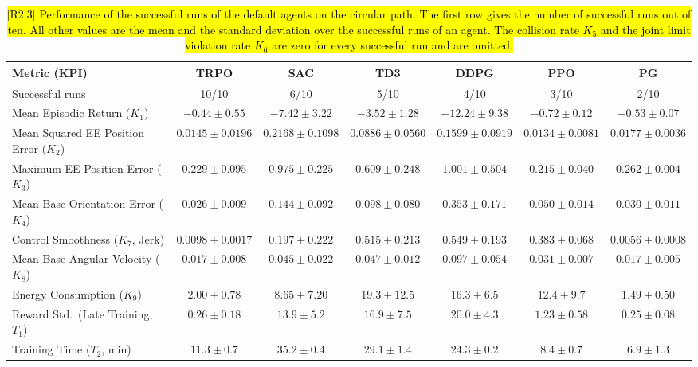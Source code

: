 \documentclass{ieeeaccess}
\newcommand{\hlone}[1]{{\sethlcolor{rone}\hl{#1}}}
\begin{document}
\begin{table}[!t]
\centering
\caption{\hlone{[R2.3] Performance of the successful runs of the default agents on the circular
path. The first row gives the number of successful runs out of ten. All other values are the mean and
the standard deviation over the successful runs of an agent. The collision rate $K_5$ and the joint
limit violation rate $K_6$ are zero for every successful run and are omitted.}}
\label{tab:kpi_comp}
\renewcommand{\arraystretch}{1.2}
\setlength{\tabcolsep}{2.4pt}
\footnotesize
\begin{tabular}{lcccccc}
\toprule
\textbf{Metric (KPI)} & \textbf{TRPO} & \textbf{SAC} & \textbf{TD3} & \textbf{DDPG} & \textbf{PPO} &
  \textbf{PG} \\
\midrule
Successful runs & 10/10 & 6/10 & 5/10 & 4/10 & 3/10 & 2/10 \\
Mean Episodic Return ($K_1$) & $-0.44 \pm 0.55$ & $-7.42 \pm 3.22$ & $-3.52 \pm 1.28$ &
  $-12.24 \pm 9.38$ & $-0.72 \pm 0.12$ & $-0.53 \pm 0.07$ \\
Mean Squared EE Position Error ($K_2$) & $0.0145 \pm 0.0196$ & $0.2168 \pm 0.1098$ &
  $0.0886 \pm 0.0560$ & $0.1599 \pm 0.0919$ & $0.0134 \pm 0.0081$ & $0.0177 \pm 0.0036$ \\
Maximum EE Position Error ($K_3$) & $0.229 \pm 0.095$ & $0.975 \pm 0.225$ & $0.609 \pm 0.248$ &
  $1.001 \pm 0.504$ & $0.215 \pm 0.040$ & $0.262 \pm 0.004$ \\
Mean Base Orientation Error ($K_4$) & $0.026 \pm 0.009$ & $0.144 \pm 0.092$ & $0.098 \pm 0.080$ &
  $0.353 \pm 0.171$ & $0.050 \pm 0.014$ & $0.030 \pm 0.011$ \\
Control Smoothness ($K_7$, Jerk) & $0.0098 \pm 0.0017$ & $0.197 \pm 0.222$ & $0.515 \pm 0.213$ &
  $0.549 \pm 0.193$ & $0.383 \pm 0.068$ & $0.0056 \pm 0.0008$ \\
Mean Base Angular Velocity ($K_8$) & $0.017 \pm 0.008$ & $0.045 \pm 0.022$ & $0.047 \pm 0.012$ &
  $0.097 \pm 0.054$ & $0.031 \pm 0.007$ & $0.017 \pm 0.005$ \\
Energy Consumption ($K_9$) & $2.00 \pm 0.78$ & $8.65 \pm 7.20$ & $19.3 \pm 12.5$ & $16.3 \pm 6.5$ &
  $12.4 \pm 9.7$ & $1.49 \pm 0.50$ \\
Reward Std.\ (Late Training, $T_1$) & $0.26 \pm 0.18$ & $13.9 \pm 5.2$ & $16.9 \pm 7.5$ &
  $20.0 \pm 4.3$ & $1.23 \pm 0.58$ & $0.25 \pm 0.08$ \\
Training Time ($T_2$, min) & $11.3 \pm 0.7$ & $35.2 \pm 0.4$ & $29.1 \pm 1.4$ & $24.3 \pm 0.2$ &
  $8.4 \pm 0.7$ & $6.9 \pm 1.3$ \\
\bottomrule
\end{tabular}
\end{table}
\end{document}
